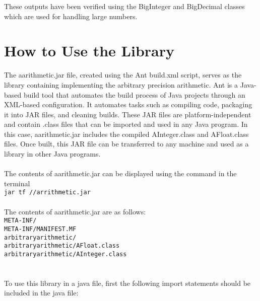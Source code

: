 \documentclass[a4paper,12pt]{article}
\begin{document}
These outputs have been verified using the BigInteger and BigDecimal classes which are used for handling large numbers.

\section{How to Use the Library}
 The aarithmetic.jar file, created using the Ant build.xml script, serves as the library containing implementing the arbitrary precision arithmetic. Ant is a Java-based build tool that automates the build process of Java projects through an XML-based configuration. It automates tasks such as compiling code, packaging it into JAR files, and cleaning builds. These JAR files are platform-independent and contain .class files that can be imported and used in any Java program. In this case, aarithmetic.jar includes the compiled AInteger.class and AFloat.class files. Once built, this JAR file can be transferred to any machine and used as a library in other Java programs.\\\\
 The contents of aarithmetic.jar can be displayed using the command in the terminal\\ \texttt{jar tf //arrithmetic.jar}\\\\The contents of aarithmetic.jar are as follows:\\
\texttt{META-INF/ \\
META-INF/MANIFEST.MF\\
arbitraryarithmetic/\\
arbitraryarithmetic/AFloat.class\\
arbitraryarithmetic/AInteger.class\\}\\\\
To use this library in a java file,  first the following import statements should be included in the java file:
\end{document}
